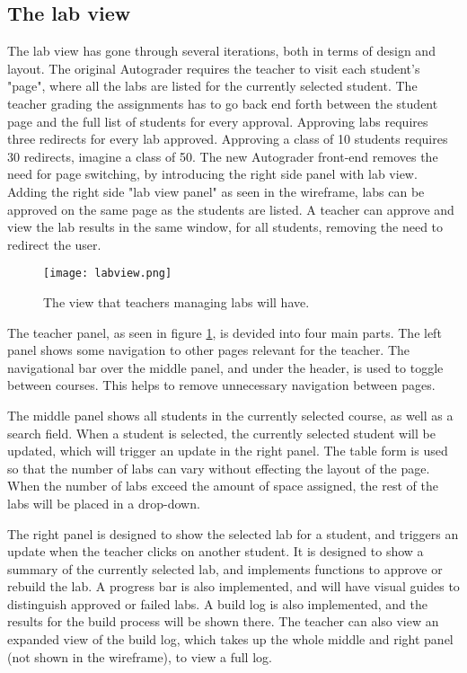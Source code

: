 \subsection{The lab view}
The lab view has gone through several iterations, both in terms of design and layout. The original Autograder requires the teacher to visit each student's "page", where all the labs are listed for the currently selected student. The teacher grading the assignments has to go back end forth between the student page and the full list of students for every approval. Approving labs requires three redirects for every lab approved. Approving a class of 10 students requires 30 redirects, imagine a class of 50. The new Autograder front-end removes the need for page switching, by introducing the right side panel with lab view. Adding the right side "lab view panel" as seen in the wireframe, labs can be approved on the same page as the students are listed. A teacher can approve and view the lab results in the same window, for all students, removing the need to redirect the user.

\begin{figure}[h!]
   \centering
   \texttt{[image: labview.png]}
   \caption{The view that teachers managing labs will have.}
   \label{fig:theLabView}
\end{figure}

The teacher panel, as seen in figure \ref{fig:theLabView}, is devided into four main parts. The left panel shows some navigation to other pages relevant for the teacher. The navigational bar over the middle panel, and under the header, is used to toggle between courses. This helps to remove unnecessary navigation between pages.

The middle panel shows all students in the currently selected course, as well as a search field. When a student is selected, the currently selected student will be updated, which will trigger an update in the right panel. The table form is used so that the number of labs can vary without effecting the layout of the page. When the number of labs exceed the amount of space assigned, the rest of the labs will be placed in a drop-down.

The right panel is designed to show the selected lab for a student, and triggers an update when the teacher clicks on another student. It is designed to show a summary of the currently selected lab, and implements functions to approve or rebuild the lab. A progress bar is also implemented, and will have visual guides to distinguish approved or failed labs. A build log is also implemented, and the results for the build process will be shown there. The teacher can also view an expanded view of the build log, which takes up the whole middle and right panel (not shown in the wireframe), to view a full log.

